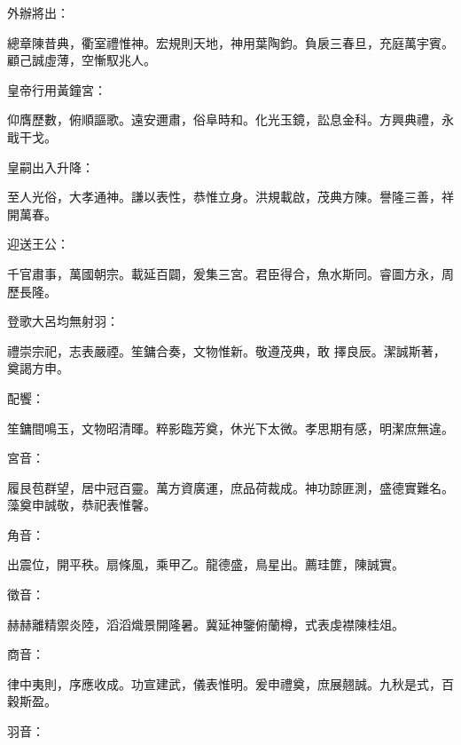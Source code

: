 \begin{pinyinscope}
 外辦將出：



 總章陳昔典，衢室禮惟神。宏規則天地，神用葉陶鈞。負扆三春旦，充庭萬宇賓。顧己誠虛薄，空慚馭兆人。



 皇帝行用黃鐘宮：



 仰膺歷數，俯順謳歌。遠安邇肅，俗阜時和。化光玉鏡，訟息金科。方興典禮，永戢干戈。



 皇嗣出入升降：



 至人光俗，大孝通神。謙以表性，恭惟立身。洪規載啟，茂典方陳。譽隆三善，祥開萬春。



 迎送王公：



 千官肅事，萬國朝宗。載延百闢，爰集三宮。君臣得合，魚水斯同。睿圖方永，周歷長隆。



 登歌大呂均無射羽：



 禮崇宗祀，志表嚴禋。笙鏞合奏，文物惟新。敬遵茂典，敢
 擇良辰。潔誠斯著，奠謁方申。



 配饗：



 笙鏞間鳴玉，文物昭清暉。粹影臨芳奠，休光下太微。孝思期有感，明潔庶無違。



 宮音：



 履艮苞群望，居中冠百靈。萬方資廣運，庶品荷裁成。神功諒匪測，盛德實難名。藻奠申誠敬，恭祀表惟馨。



 角音：



 出震位，開平秩。扇條風，乘甲乙。龍德盛，鳥星出。薦珪篚，陳誠實。



 徵音：



 赫赫離精禦炎陸，滔滔熾景開隆暑。冀延神鑒俯蘭樽，式表虔襟陳桂俎。



 商音：



 律中夷則，序應收成。功宣建武，儀表惟明。爰申禮奠，庶展翹誠。九秋是式，百穀斯盈。



 羽音：




\end{pinyinscope}
